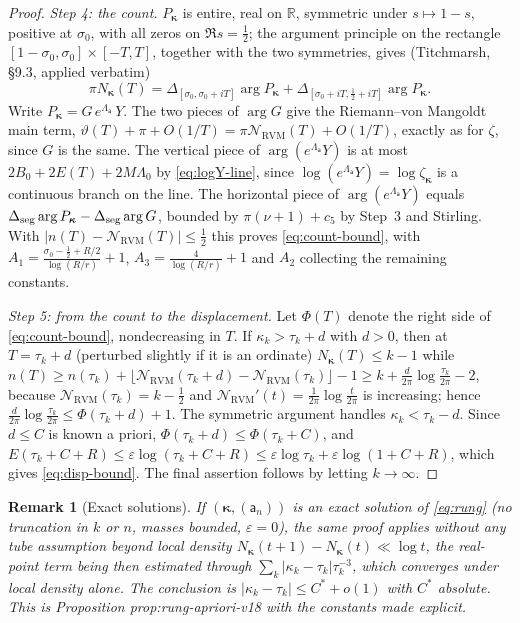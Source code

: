 \documentclass[11pt]{article}
\newtheorem{remark}{Remark}
\newcommand{\RVM}{\mathrm{RVM}}
\newcommand{\NR}{\mathcal N_{\RVM}}
\begin{document}
\begin{proof}
\emph{Step 4: the count.} $P_{\boldsymbol\kappa}$ is entire, real on $\mathbb R$, symmetric under $s\mapsto1-s$, positive at $\sigma_0$, with all zeros on $\Re s=\frac12$; the argument principle on the rectangle $[1-\sigma_0,\sigma_0]\times[-T,T]$, together with the two symmetries, gives (Titchmarsh, \S9.3, applied verbatim)
\[
 \pi N_{\boldsymbol\kappa}(T)=\Delta_{[\sigma_0,\sigma_0+iT]}\arg P_{\boldsymbol\kappa}+\Delta_{[\sigma_0+iT,\frac12+iT]}\arg P_{\boldsymbol\kappa}.
\]
Write $P_{\boldsymbol\kappa}=G\,e^{\Lambda_{\mathsf a}}\,Y$. The two pieces of $\arg G$ give the Riemann--von Mangoldt main term, $\vartheta(T)+\pi+O(1/T)=\pi\NR(T)+O(1/T)$, exactly as for $\zeta$, since $G$ is the same. The vertical piece of $\arg(e^{\Lambda_{\mathsf a}}Y)$ is at most $2B_0+2E(T)+2M\Lambda_0$ by \eqref{eq:logY-line}, since $\log(e^{\Lambda_{\mathsf a}}Y)=\log\zeta_{\boldsymbol\kappa}$ is a continuous branch on the line. The horizontal piece of $\arg(e^{\Lambda_{\mathsf a}}Y)$ equals $\Delta_{\rm seg}\arg P_{\boldsymbol\kappa}-\Delta_{\rm seg}\arg G$, bounded by $\pi(\nu+1)+c_5$ by Step~3 and Stirling. With $|n(T)-\NR(T)|\le\frac12$ this proves \eqref{eq:count-bound}, with $A_1=\frac{\sigma_0-\frac12+R/2}{\log(R/r)}+1$, $A_3=\frac{4}{\log(R/r)}+1$ and $A_2$ collecting the remaining constants.

\emph{Step 5: from the count to the displacement.} Let $\Phi(T)$ denote the right side of \eqref{eq:count-bound}, nondecreasing in $T$. If $\kappa_k>\tau_k+d$ with $d>0$, then at $T=\tau_k+d$ (perturbed slightly if it is an ordinate) $N_{\boldsymbol\kappa}(T)\le k-1$ while $n(T)\ge n(\tau_k)+\lfloor\NR(\tau_k+d)-\NR(\tau_k)\rfloor-1\ge k+\frac{d}{2\pi}\log\frac{\tau_k}{2\pi}-2$, because $\NR(\tau_k)=k-\frac12$ and $\NR'(t)=\frac1{2\pi}\log\frac t{2\pi}$ is increasing; hence $\frac d{2\pi}\log\frac{\tau_k}{2\pi}\le\Phi(\tau_k+d)+1$. The symmetric argument handles $\kappa_k<\tau_k-d$. Since $d\le C$ is known a priori, $\Phi(\tau_k+d)\le\Phi(\tau_k+C)$, and $E(\tau_k+C+R)\le\varepsilon\log(\tau_k+C+R)\le\varepsilon\log\tau_k+\varepsilon\log(1+C+R)$, which gives \eqref{eq:disp-bound}. The final assertion follows by letting $k\to\infty$.
\end{proof}

\begin{remark}[Exact solutions]
If $(\boldsymbol\kappa,(\mathsf a_n))$ is an exact solution of \eqref{eq:rung} (no truncation in $k$ or $n$, masses bounded, $\varepsilon=0$), the same proof applies without any tube assumption beyond local density $N_{\boldsymbol\kappa}(t+1)-N_{\boldsymbol\kappa}(t)\ll\log t$, the real-point term being then estimated through $\sum_k|\kappa_k-\tau_k|\tau_k^{-3}$, which converges under local density alone. The conclusion is $|\kappa_k-\tau_k|\le C^*+o(1)$ with $C^*$ absolute. This is Proposition prop:rung-apriori-v18 with the constants made explicit.
\end{remark}
\end{document}
